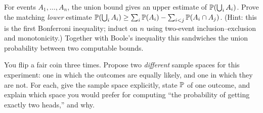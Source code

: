 \begin{exercise}
\label{ch03:exr-sandwich}
For events $A_1, \dots, A_n$, the union bound gives an upper estimate of
$\P(\bigcup_i A_i)$. Prove the matching \emph{lower} estimate
$\P(\bigcup_i A_i) \ge \sum_i \P(A_i) - \sum_{i<j}\P(A_i \cap A_j)$. (Hint: this
is the first Bonferroni inequality; induct on $n$ using two-event
inclusion--exclusion and monotonicity.) Together with Boole's inequality this
sandwiches the union probability between two computable bounds.
\end{exercise}

\begin{exercise}
\label{ch03:exr-conceptual}
You flip a fair coin three times. Propose two \emph{different} sample spaces for
this experiment: one in which the outcomes are equally likely, and one in which
they are not. For each, give the sample space explicitly, state $\P$ of one
outcome, and explain which space you would prefer for computing ``the probability
of getting exactly two heads,'' and why.
\end{exercise}
